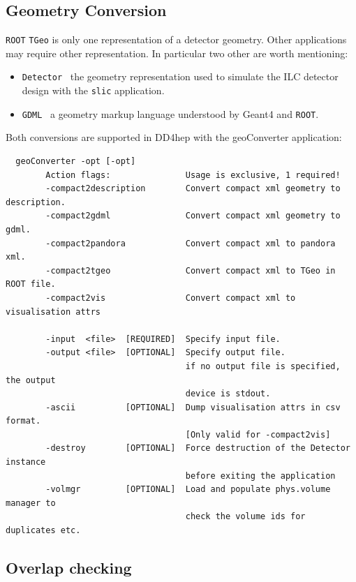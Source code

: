 \subsection{Geometry Conversion}
\label{sec:dd4hep-manual-geometry-conversion}

\texttt{ROOT} \texttt{TGeo} is only one representation of a detector geometry. Other applications may require other representation. In particular two other are worth mentioning:
\begin{itemize}
\item \texttt{Detector}~\cite{Gaede:81331} the geometry representation used to simulate the ILC detector design with the \texttt{slic} application.
\item \texttt{GDML}~\cite{Chytracek:2006be} a geometry markup language understood by Geant4 and \texttt{ROOT}.
\end{itemize}
Both conversions are supported in DD4hep with the geoConverter application:
\begin{verbatim}
  geoConverter -opt [-opt]
        Action flags:               Usage is exclusive, 1 required!
        -compact2description        Convert compact xml geometry to description.
        -compact2gdml               Convert compact xml geometry to gdml.
        -compact2pandora            Convert compact xml to pandora xml.
        -compact2tgeo               Convert compact xml to TGeo in ROOT file.
        -compact2vis                Convert compact xml to visualisation attrs

        -input  <file>  [REQUIRED]  Specify input file.
        -output <file>  [OPTIONAL]  Specify output file.
                                    if no output file is specified, the output
                                    device is stdout.
        -ascii          [OPTIONAL]  Dump visualisation attrs in csv format.
                                    [Only valid for -compact2vis]
        -destroy        [OPTIONAL]  Force destruction of the Detector instance
                                    before exiting the application
        -volmgr         [OPTIONAL]  Load and populate phys.volume manager to
                                    check the volume ids for duplicates etc.
\end{verbatim}

\subsection{Overlap checking}
\label{sec:dd4hep-manual-overlap-checking}


